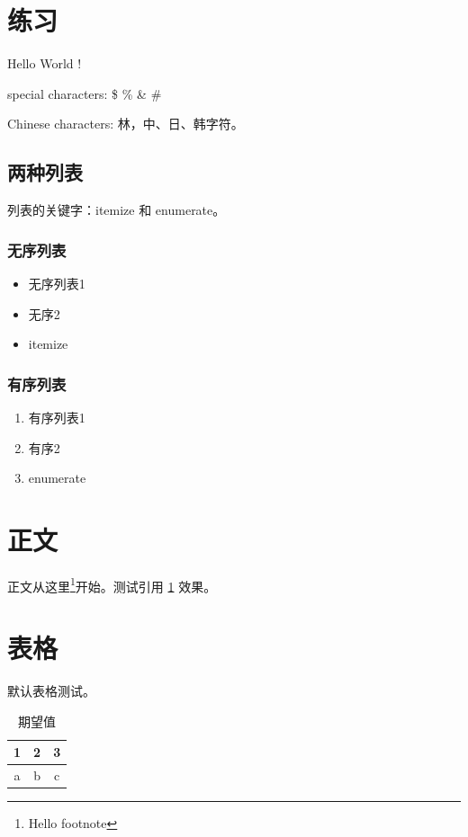 \documentclass[UTF8]{ctexart}
\begin{document}
\tableofcontents

\newpage
\section{练习}
Hello World !

special characters: \$ \% \& \#

Chinese characters: 林，中、日、韩字符。

\subsection{两种列表}
列表的关键字：itemize 和 enumerate。
\subsubsection{无序列表}
\begin{itemize}
    \item 无序列表1
    \item 无序2
    \item itemize
\end{itemize}
\subsubsection{有序列表}
\begin{enumerate}
    \item 有序列表1
    \item 有序2
    \item enumerate
\end{enumerate}

\newpage
\section{正文}
正文从这里\footnote{\label{fntest}Hello footnote}开始。测试引用 \ref{fntest} 效果。

\newpage
\section{表格}
默认表格测试。
\begin{table}[htb]
    \centering
    \caption{期望值}
    \label{tab:E}
    \begin{tabular}{c|c||c}
        1 & 2 & 3\\
        \hline
        a & b & c\\
    \end{tabular}
\end{table}
\end{document}
